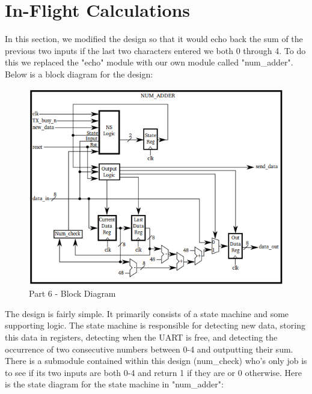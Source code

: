 \documentclass{article}
\begin{document}
\pagebreak


\section{In-Flight Calculations}
In this section, we modified the design so that it would echo back the sum of the previous two inputs if the last two characters entered we both 0 through 4. To do this we replaced the "echo" module with our own module called "num\_adder". Below is a block diagram for the design: \\


	\begin{figure}[h]
		\begin{center}
			\includegraphics[scale=0.55]{../block_diagrams/part_6_block_diagram_num_adder.png}
			\caption{Part 6 - Block Diagram}
		\end{center}
	\end{figure}

The design is fairly simple. It primarily consists of a state machine and some supporting logic. The state machine is responsible for detecting new data, storing this data in registers, detecting when the UART is free, and detecting the occurrence of two consecutive numbers between 0-4 and outputting their sum. There is a submodule contained within this design (num\_check) who's only job is to see if its two inputs are both 0-4 and return 1 if they are or 0 otherwise. Here is the state diagram for the state machine in "num\_adder": \\
\end{document}
